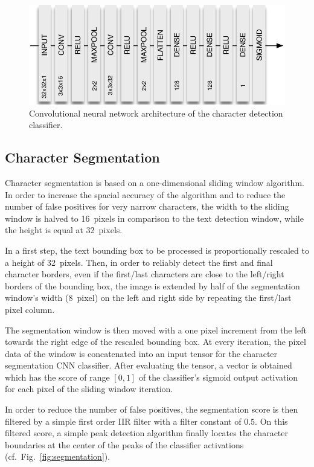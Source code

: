 \documentclass[11pt]{article}
\newcommand\figref[1]{Fig.~\ref{fig:#1}}
\begin{document}
\begin{figure}[ht]
  \centering
  \includegraphics[scale=0.75]{fig/Detection_CNN}
  \caption
  {
    Convolutional neural network architecture of the character detection classifier.
  }
  \label{fig:detection_cnn}
\end{figure}

\subsection{Character Segmentation}
\label{sec:segmentation_algorithm}
Character segmentation is based on a one-dimensional sliding window algorithm. In order to
increase the spacial accuracy of the algorithm and to reduce the number of false positives
for very narrow characters, the width to the sliding window is halved to 16~pixels in comparison
to the text detection window, while the height is equal at 32~pixels.

In a first step, the text bounding box to be processed is proportionally rescaled to a height of 32~pixels.
Then, in order to reliably detect the first and final character borders, even if the first/last
characters are close to the left/right borders of the bounding box, the image is extended by
half of the segmentation window's width (8~pixel) on the left and right side by repeating the first/last
pixel column.

The segmentation window is then moved with a one pixel increment from the left towards the right
edge of the rescaled bounding box. At every iteration, the pixel data of the window is concatenated
into an input tensor for the character segmentation CNN classifier. After evaluating the
tensor, a vector is obtained which has the score of range $[0,1]$ of the classifier's sigmoid output activation
for each pixel of the sliding window iteration.

In order to reduce the number of false positives, the segmentation score is then filtered by
a simple first order IIR filter \cite{Infinite55:online} with a filter constant of $0.5$. On this
filtered score, a simple peak detection algorithm finally locates the character boundaries at
the center of the peaks of the classifier activations (cf.~\figref{segmentation}).
\end{document}
